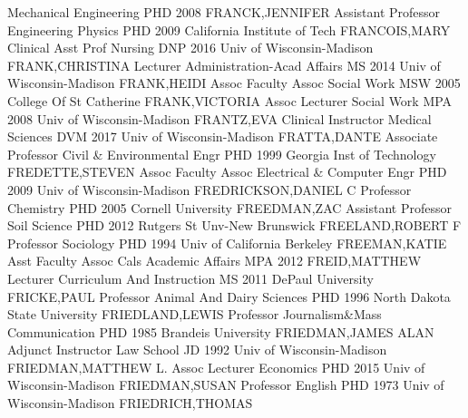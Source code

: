 \documentclass[
]{article}
\begin{document}
\textbar Mechanical Engineering \textbar PHD 2008 \textbar{}
 \textbar FRANCK,JENNIFER \textbar Assistant Professor
\textbar Engineering Physics \textbar PHD 2009 California Institute of
Tech \textbar{}  \textbar FRANCOIS,MARY \textbar Clinical
Asst Prof \textbar Nursing \textbar DNP 2016 Univ of Wisconsin-Madison
\textbar{}  \textbar FRANK,CHRISTINA \textbar Lecturer
\textbar Administration-Acad Affairs \textbar MS 2014 Univ of
Wisconsin-Madison \textbar{}  \textbar FRANK,HEIDI
\textbar Assoc Faculty Assoc \textbar Social Work \textbar MSW 2005
College Of St Catherine \textbar{}  \textbar FRANK,VICTORIA
\textbar Assoc Lecturer \textbar Social Work \textbar MPA 2008 Univ of
Wisconsin-Madison \textbar{}  \textbar FRANTZ,EVA
\textbar Clinical Instructor \textbar Medical Sciences \textbar DVM 2017
Univ of Wisconsin-Madison \textbar{}  \textbar FRATTA,DANTE
\textbar Associate Professor \textbar Civil \& Environmental Engr
\textbar PHD 1999 Georgia Inst of Technology \textbar{} 
\textbar FREDETTE,STEVEN \textbar Assoc Faculty Assoc
\textbar Electrical \& Computer Engr \textbar PHD 2009 Univ of
Wisconsin-Madison \textbar{}  \textbar FREDRICKSON,DANIEL C
\textbar Professor \textbar Chemistry \textbar PHD 2005 Cornell
University \textbar{}  \textbar FREEDMAN,ZAC
\textbar Assistant Professor \textbar Soil Science \textbar PHD 2012
Rutgers St Unv-New Brunswick \textbar{} 
\textbar FREELAND,ROBERT F \textbar Professor \textbar Sociology
\textbar PHD 1994 Univ of California Berkeley \textbar{} 
\textbar FREEMAN,KATIE \textbar Asst Faculty Assoc \textbar Cals
Academic Affairs \textbar MPA 2012 \textbar{} 
\textbar FREID,MATTHEW \textbar Lecturer \textbar Curriculum And
Instruction \textbar MS 2011 DePaul University \textbar{} 
\textbar FRICKE,PAUL \textbar Professor \textbar Animal And Dairy
Sciences \textbar PHD 1996 North Dakota State University \textbar{}
 \textbar FRIEDLAND,LEWIS \textbar Professor
\textbar Journalism\&Mass Communication \textbar PHD 1985 Brandeis
University \textbar{}  \textbar FRIEDMAN,JAMES ALAN
\textbar Adjunct Instructor \textbar Law School \textbar JD 1992 Univ of
Wisconsin-Madison \textbar{}  \textbar FRIEDMAN,MATTHEW L.
\textbar Assoc Lecturer \textbar Economics \textbar PHD 2015 Univ of
Wisconsin-Madison \textbar{}  \textbar FRIEDMAN,SUSAN
\textbar Professor \textbar English \textbar PHD 1973 Univ of
Wisconsin-Madison \textbar{}  \textbar FRIEDRICH,THOMAS
\end{document}

